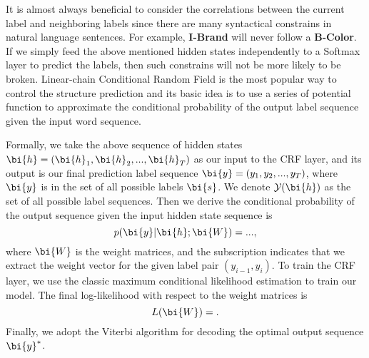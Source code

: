 It is almost always beneficial to consider the correlations
between the current label and neighboring
labels since there are many syntactical constrains
in natural language sentences. For example,
\textbf{I-Brand} will never follow a \textbf{B-Color}. If
we simply feed the above mentioned hidden states
independently to a Softmax layer to predict the labels\cite{hakanni-tur2016multidomain},
then such constrains will not be more likely
to be broken. Linear-chain Conditional Random
Field is the most popular way to control the structure
prediction and its basic idea is to use a series
of potential function to approximate the conditional
probability of the output label sequence
given the input word sequence.

Formally, we take the above sequence of hidden
states $\bi{h} = (\bi{h}_1, \bi{h}_2, ..., \bi{h}_T)$
as our input to the CRF layer,
and its output is our final prediction label sequence
$\bi{y} = (y_1, y_2, ..., y_T)$,
where $\bi{y}$ is in the set of all possible labels $\bi{s}$.
We denote $\mathcal{Y}(\bi{h})$ as the set of all possible label sequences.
Then we derive the conditional probability of the output sequence
given the input hidden state sequence is
$$
p(\bi{y}|\bi{h};\bi{W})= ... ,
$$
where $\bi{W}$ is the weight matrices,
and the subscription indicates that we extract the
weight vector for the given label pair $(y_{i-1}, y_i)$.
To train the CRF layer, we use the classic maximum
conditional likelihood estimation to train our
model. The final log-likelihood with respect to the
weight matrices is
$$
L(\bi{W}) = .
$$
Finally, we adopt the Viterbi algorithm for decoding the optimal output sequence $\bi{y}^{*}$.